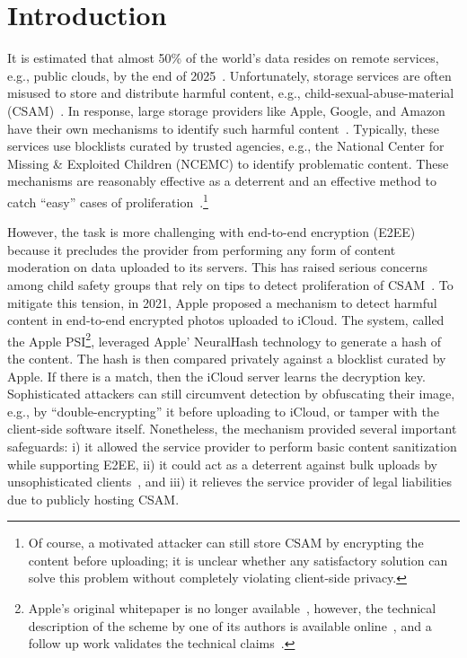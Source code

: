\section{Introduction}
%


It is estimated that almost 50\% of the world's data resides on
remote services, e.g., public clouds, by the end of 2025~\cite{public_storage_vol,bartley2025bigdata}. 
Unfortunately, storage services are often misused to store and distribute harmful
content, e.g., child-sexual-abuse-material (CSAM)~\cite{williams2022csam}. In response,
large storage providers like Apple, Google, and Amazon have their own
mechanisms to identify such harmful content~\cite{apple2021csam,
  googleCSAM, amazonCSAM}. Typically, these services use blocklists curated by trusted agencies, e.g., the National Center for Missing \& Exploited Children (NCEMC) to identify problematic content. These mechanisms are reasonably effective as a deterrent and an effective method to catch ``easy'' cases of proliferation~\cite{}.\footnote{Of course, a motivated attacker can still store CSAM by encrypting the content before uploading; it is unclear whether any satisfactory solution can solve this problem without completely violating client-side privacy.}


However, the task is more challenging with end-to-end encryption (E2EE)~\cite{content_mod_e2ee} because it precludes the provider from performing any form of content moderation on data uploaded to its servers. This has raised serious concerns among child safety groups that rely on tips to detect proliferation of CSAM~\cite{doj2020international}. 
To mitigate this tension, in 2021, Apple proposed a mechanism  
to detect harmful content in end-to-end encrypted photos uploaded to iCloud. The system, called the Apple PSI\footnote{Apple's original whitepaper is no longer available~\cite{bhowmick2021apple}, however, the technical description of the scheme by one of its authors is available online~\cite{pinkas2021applepsi,rescorla2021applecsam}, and a follow up work validates the technical claims~\cite{scheffler2023public}.}, leveraged Apple' NeuralHash technology to generate a hash of the content. The hash is then compared privately against a blocklist curated by Apple. 
If there is a match, then the iCloud server learns the decryption key. Sophisticated attackers can still circumvent detection by obfuscating their image, e.g., by ``double-encrypting'' it before uploading to iCloud, or tamper with the client-side software itself. Nonetheless, the mechanism provided several important safeguards: i) it allowed the service provider to perform basic content sanitization while supporting E2EE, ii) it could act as a deterrent against bulk uploads by unsophisticated clients~\cite{csam_example_1,csam_example_2}, and iii) it relieves the service provider of legal liabilities due to publicly hosting CSAM. 

